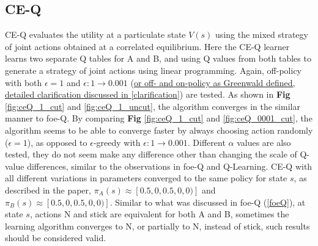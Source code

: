 \documentclass[10pt]{article}
\begin{document}

\subsection{CE-Q} \label{ceQ}
CE-Q evaluates the utility at a particulate state $V(s)$ using the mixed strategy of joint actions obtained at a correlated equilibrium. Here the CE-Q learner learns two separate Q tables for A and B, and using Q values from both tables to generate a strategy of joint actions using linear programming. Again, off-policy with both $\epsilon=1$ and $\epsilon:1\rightarrow0.001$ (\ul{or off- and on-policy as Greenwald defined, detailed clarification discussed in }\ref{clarification})\cite{GreenwaldCorrelatedQLearning2005} are tested. As shown in \textbf{Fig} \ref{fig:ceQ_1_cut} and \ref{fig:ceQ_1_uncut}, the algorithm converges in the similar manner to foe-Q. By comparing \textbf{Fig} \ref{fig:ceQ_1_cut} and \ref{fig:ceQ_0001_cut}, the algorithm seems to be able to converge faster by always choosing action randomly ($\epsilon=1$), as opposed to $\epsilon$-greedy with $\epsilon:1\rightarrow0.001$. Different $\alpha$ values are also tested, they do not seem make any difference other than changing the scale of Q-value differences, similar to the observations in foe-Q and Q-Learning. CE-Q with all different variations in parameters converged to the same policy for state $s$, as described in the paper\cite{GreenwaldCorrelatedQLearning2003}, $\pi_A(s)\approx[0.5,0,0.5,0,0)]$ and $\pi_B(s)\approx[0.5,0,0.5,0,0)]$. Similar to what was discussed in foe-Q (\ref{foeQ}), at state $s$, actions N and stick are equivalent for both A and B, sometimes the learning algorithm converges to N, or partially to N, instead of stick, such results should be considered valid.
\end{document}
